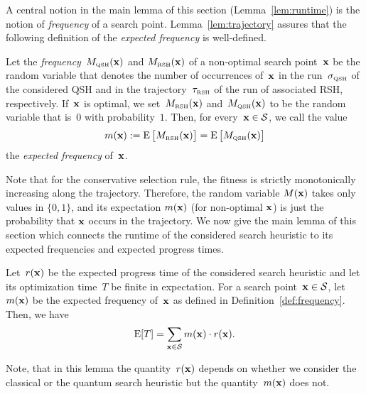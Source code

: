 \documentclass[a4paper,11pt]{article}
\begin{document}
A central notion in the main lemma of this section (Lemma~\ref{lem:runtime}) is the notion of \emph{frequency} of a search point. Lemma~\ref{lem:trajectory} assures that the following definition of the \emph{expected frequency} is well-defined.
\begin{definition}
\label{def:frequency}
Let the \emph{frequency}~$M_\QSH(\xvec)$ and $M_\RSH(\xvec)$ of a non-optimal search point~$\xvec$ be the random variable that denotes the number of occurrences of~$\xvec$ in the run~$\sigma_{\text{\tiny\rm QSH}}$ of the considered QSH and in the trajectory~$\tau_{\text{\tiny\rm RSH}}$ of the run of associated RSH, respectively. If~$\xvec$ is optimal, we set~$M_\RSH(\xvec)$ and~$M_\QSH(\xvec)$  to be the random variable that is~$0$ with probability~$1$. Then, for every~$\xvec\in\mathcal{S}$, we call the value
\[
m(\xvec):=\EXP\big[M_\RSH(\xvec)\big]=\EXP\big[M_\QSH(\xvec)\big]
\]
the \emph{expected frequency} of~$\xvec$.
\end{definition}

Note that for the conservative selection rule, the fitness is strictly monotonically increasing along the trajectory. Therefore, the random variable $M(\xvec)$ takes only values in $\{0,1\}$, and its expectation $m(\xvec)$ (for non-optimal $\xvec$) is just the probability that $\xvec$ occurs in the trajectory. We now give the main lemma of this section which connects the runtime of the considered search heuristic to its expected frequencies and expected progress times.

\begin{lemma}\label{lem:runtime}
Let~$r(\xvec)$ be the expected progress time of the considered search heuristic and let its optimization time~$T$ be finite in expectation. For a search point~$\xvec\in\mathcal{S}$, let $m(\xvec)$ be the expected frequency of~$\xvec$ as defined in Definition~\ref{def:frequency}. Then, we have
\[
\EXP[T] = \sum_{\xvec \in \mathcal{S}} m(\xvec) \cdot r(\xvec).
\]
\end{lemma}

Note, that in this lemma the quantity~$r(\xvec)$ depends on whether we consider the classical or the quantum search heuristic but the quantity~$m(\xvec)$ does not.
\end{document}
